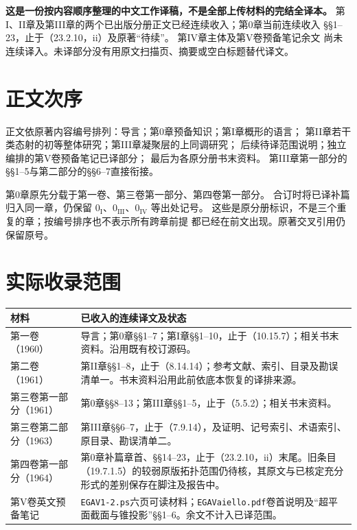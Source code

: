 \maketitle
{}
\noindent\textbf{这是一份按内容顺序整理的中文工作译稿，不是全部上传材料的完结全译本。}
第I、II章及第III章的两个已出版分册正文已经连续收入；第0章当前连续收入
§§1--23，止于（23.2.10，ii）及原著“待续”。
第IV章主体及第V卷预备笔记余文
尚未连续译入。未译部分没有用原文扫描页、摘要或空白标题替代译文。

\section*{正文次序}
正文依原著内容编号排列：导言；第0章预备知识；第I章概形的语言；
第II章若干类态射的初等整体研究；第III章凝聚层的上同调研究；
后续待译范围说明；独立编排的第V卷预备笔记已译部分；
最后为各原分册书末资料。
第III章第一部分的§§1--5与第二部分的§§6--7直接衔接。

第0章原先分载于第一卷、第三卷第一部分、第四卷第一部分。
合订时将已译补篇归入同一章，仍保留
$0_{\mathrm I}$、$0_{\mathrm{III}}$、$0_{\mathrm{IV}}$ 等出处记号。
这些是原分册标识，不是三个重复的章；按编号排序也不表示所有跨章前提
都已经在前文出现。原著交叉引用仍保留原号。

\section*{实际收录范围}
\begin{longtable}{@{}p{.25\linewidth}p{.67\linewidth}@{}}
\toprule 材料&已收入的连续译文及状态\\\midrule\endhead
第一卷（1960）&导言；第0章§§1--7；第I章§§1--10，止于（10.15.7）；相关书末资料。沿用既有校订源码。\\
第二卷（1961）&第II章§§1--8，止于（8.14.14）；参考文献、索引、目录及勘误清单一。书末资料沿用此前依底本恢复的译排来源。\\
第三卷第一部分（1961）&第0章§§8--13；第III章§§1--5，止于（5.5.2）；相关书末资料。\\
第三卷第二部分（1963）&第III章§§6--7，止于（7.9.14），及证明、记号索引、术语索引、原目录、勘误清单二。\\
第四卷第一部分（1964）&第0章补篇章首、§§14--23，止于（23.2.10，ii）末尾。旧条目（19.7.1.5）的较弱原版拓扑范围仍待核，其原文与已核定充分形式的差别保存在脚注及报告中。\\
第V卷英文预备笔记&\texttt{EGAV1-2.ps}六页可读材料；\texttt{EGAVaiello.pdf}卷首说明及“超平面截面与锥投影”§§1--6。余文不计入已译范围。\\
\bottomrule
\end{longtable}


